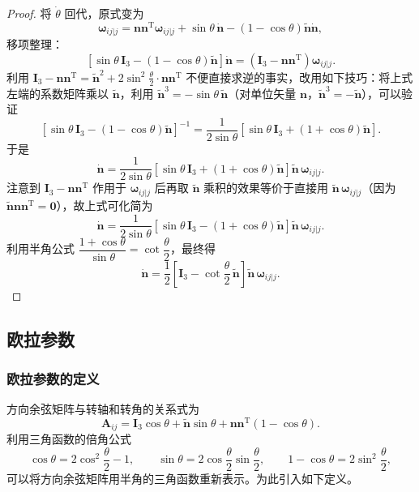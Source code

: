 \begin{proof}
	将 $\dot{\theta}$ 回代，原式变为
	$$
	\boldsymbol{\omega}_{ij|j}=\boldsymbol{n}\boldsymbol{n}^{\mathrm{T}}\boldsymbol{\omega}_{ij|j}+\sin\theta\,\dot{\boldsymbol{n}}-(1-\cos\theta)\tilde{\boldsymbol{n}}\dot{\boldsymbol{n}},
	$$
	移项整理：
	$$
	\left[\sin\theta\,\boldsymbol{I}_3-(1-\cos\theta)\tilde{\boldsymbol{n}}\right]\dot{\boldsymbol{n}}=\left(\boldsymbol{I}_3-\boldsymbol{n}\boldsymbol{n}^{\mathrm{T}}\right)\boldsymbol{\omega}_{ij|j}.
	$$
	利用 $\boldsymbol{I}_3-\boldsymbol{n}\boldsymbol{n}^{\mathrm{T}}=\tilde{\boldsymbol{n}}^2+2\sin^2\frac{\theta}{2}\cdot\boldsymbol{n}\boldsymbol{n}^{\mathrm{T}}$ 不便直接求逆的事实，改用如下技巧：将上式左端的系数矩阵乘以 $\tilde{\boldsymbol{n}}$，利用 $\tilde{\boldsymbol{n}}^3=-\sin\theta\,\tilde{\boldsymbol{n}}$（对单位矢量 $\boldsymbol{n}$，$\tilde{\boldsymbol{n}}^3=-\tilde{\boldsymbol{n}}$），可以验证
	$$
	\left[\sin\theta\,\boldsymbol{I}_3-(1-\cos\theta)\tilde{\boldsymbol{n}}\right]^{-1}=\frac{1}{2\sin\theta}\left[\sin\theta\,\boldsymbol{I}_3+(1+\cos\theta)\tilde{\boldsymbol{n}}\right].
	$$
	于是
	$$
	\dot{\boldsymbol{n}}=\frac{1}{2\sin\theta}\left[\sin\theta\,\boldsymbol{I}_3+(1+\cos\theta)\tilde{\boldsymbol{n}}\right]\tilde{\boldsymbol{n}}\,\boldsymbol{\omega}_{ij|j}.
	$$
	注意到 $\boldsymbol{I}_3-\boldsymbol{n}\boldsymbol{n}^{\mathrm{T}}$ 作用于 $\boldsymbol{\omega}_{ij|j}$ 后再取 $\tilde{\boldsymbol{n}}$ 乘积的效果等价于直接用 $\tilde{\boldsymbol{n}}\,\boldsymbol{\omega}_{ij|j}$（因为 $\tilde{\boldsymbol{n}}\boldsymbol{n}\boldsymbol{n}^{\mathrm{T}}=\boldsymbol{0}$），故上式可化简为
	$$
	\dot{\boldsymbol{n}}=\frac{1}{2\sin\theta}\left[\sin\theta\,\boldsymbol{I}_3-(1+\cos\theta)\tilde{\boldsymbol{n}}\right]\tilde{\boldsymbol{n}}\,\boldsymbol{\omega}_{ij|j}.
	$$
	利用半角公式 $\dfrac{1+\cos\theta}{\sin\theta}=\cot\dfrac{\theta}{2}$，最终得
	$$
	\dot{\boldsymbol{n}}=\frac{1}{2}\left[\boldsymbol{I}_3-\cot\frac{\theta}{2}\,\tilde{\boldsymbol{n}}\right]\tilde{\boldsymbol{n}}\,\boldsymbol{\omega}_{ij|j}.
	$$
\end{proof}

\subsection{欧拉参数}

\subsubsection{欧拉参数的定义}

方向余弦矩阵与转轴和转角的关系式为
$$
\boldsymbol{A}_{ij}=\boldsymbol{I}_3\cos\theta+\tilde{\boldsymbol{n}}\sin\theta+\boldsymbol{n}\boldsymbol{n}^{\mathrm{T}}(1-\cos\theta).
$$
利用三角函数的倍角公式
$$
\cos\theta=2\cos^2\frac{\theta}{2}-1,\qquad
\sin\theta=2\cos\frac{\theta}{2}\sin\frac{\theta}{2},\qquad
1-\cos\theta=2\sin^2\frac{\theta}{2},
$$
可以将方向余弦矩阵用半角的三角函数重新表示。为此引入如下定义。

